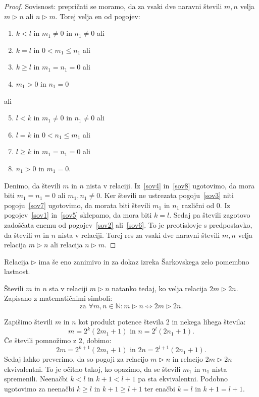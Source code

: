 \documentclass[mat2]{fmfdelo}
\newcommand{\N}{\mathbb N}
\begin{document}
\begin{proof}
Sovisnost: prepričati se moramo, da za vsaki dve naravni števili $m, n$ velja $m \triangleright n$ ali $n \triangleright m$. Torej velja en od pogojev:
\begin{enumerate}[label={(\roman*)}]
\item $k<l$ in $m_1 \neq 0$ in $n_1 \neq 0$ ali \label{sov1}
\item $k=l$ in $0<m_1 \leq n_1$ ali \label{sov2}
\item $k \geq l$ in $m_1 = n_1=0$ ali \label{sov3}
\item $m_1>0$ in $n_1 =0$ \label{sov4}
\end{enumerate}
ali 
\begin{enumerate}[label={(\roman*)}]
\setcounter{enumi}{4}
\item $l<k$ in $m_1 \neq 0$ in $n_1 \neq 0$ ali \label{sov5}
\item $l=k$ in $0<n_1 \leq m_1$ ali \label{sov6}
\item $l \geq k$ in $m_1 = n_1=0$ ali \label{sov7}
\item $n_1>0$ in $m_1 =0$. \label{sov8}
\end{enumerate}
Denimo, da števili $m$ in $n$ nista v relaciji. Iz~\ref{sov4} in~\ref{sov8} ugotovimo, da mora biti $m_1 = n_1 = 0$ ali $m_1, n_1 \neq 0$. Ker števili ne ustrezata pogoju~\ref{sov3} niti pogoju~\ref{sov7} ugotovimo, da morata biti števili $m_1$ in $n_1$ različni od 0. Iz pogojev~\ref{sov1} in~\ref{sov5} sklepamo, da mora biti $k=l$. Sedaj pa števili zagotovo zadoščata enemu od pogojev~\ref{sov2} ali~\ref{sov6}. To je preotislovje s predpostavko, da števili $m$ in $n$ nista v relaciji. Torej res za vsaki dve naravni števili $m, n$ velja relacija $m \triangleright n$ ali relacija $n \triangleright m$. 
\end{proof}

Relacija $\triangleright$ ima še eno zanimivo in za dokaz izreka Šarkovskega zelo pomembno lastnost.
\begin{trditev}
Števili $m$ in $n$ sta v relaciji $m \triangleright n$ natanko tedaj, ko velja relacija $2m \triangleright 2n$. Zapisano z matematičnimi simboli:
$$\text{za } \forall m, n \in \N: m \triangleright n \Leftrightarrow 2m \triangleright 2n.$$
\end{trditev}
\begin{dokaz}
Zapišimo števili $m$ in $n$ kot produkt potence števila 2 in nekega lihega števila:
$$m= 2^k(2m_1 +1)\text{ in } n= 2^l(2n_1 +1).$$
Če števili pomnožimo z 2, dobimo:
$$2m= 2^{k+1}(2m_1 +1)\text{ in } 2n= 2^{l+1}(2n_1 +1).$$
Sedaj lahko preverimo, da so pogoji za relacijo $m \triangleright n$ in relacijo $2m \triangleright 2n$ ekvivalentni. To je očitno takoj, ko opazimo, da se števili $m_1$ in $n_1$ nista spremenili. Neenačbi $k<l$ in $k+1<l+1$ pa sta ekvivalentni. Podobno ugotovimo za neenačbi $k \geq l$ in $k+1 \geq l+1$ ter enačbi $k=l$ in $k+1 = l+1$.
\end{dokaz}
\end{document}
